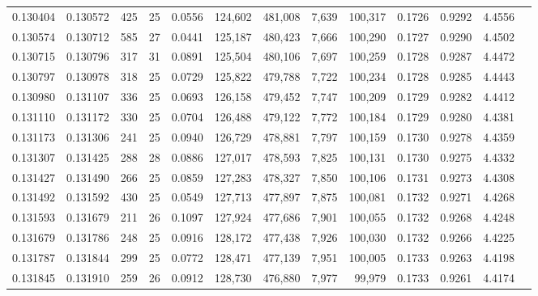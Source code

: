 \begin{tabular}{rrrrrrrrrrrrr}
0.130404 & 0.130572 & 425 &  25 &                                     0.0556 & 124,602 & 481,008 &   7,639 & 100,317 & 0.1726 & 0.9292 & 4.4556 \\
0.130574 & 0.130712 & 585 &  27 &                                     0.0441 & 125,187 & 480,423 &   7,666 & 100,290 & 0.1727 & 0.9290 & 4.4502 \\
0.130715 & 0.130796 & 317 &  31 &                                     0.0891 & 125,504 & 480,106 &   7,697 & 100,259 & 0.1728 & 0.9287 & 4.4472 \\
0.130797 & 0.130978 & 318 &  25 &                                     0.0729 & 125,822 & 479,788 &   7,722 & 100,234 & 0.1728 & 0.9285 & 4.4443 \\
0.130980 & 0.131107 & 336 &  25 &                                     0.0693 & 126,158 & 479,452 &   7,747 & 100,209 & 0.1729 & 0.9282 & 4.4412 \\
0.131110 & 0.131172 & 330 &  25 &                                     0.0704 & 126,488 & 479,122 &   7,772 & 100,184 & 0.1729 & 0.9280 & 4.4381 \\
0.131173 & 0.131306 & 241 &  25 &                                     0.0940 & 126,729 & 478,881 &   7,797 & 100,159 & 0.1730 & 0.9278 & 4.4359 \\
0.131307 & 0.131425 & 288 &  28 &                                     0.0886 & 127,017 & 478,593 &   7,825 & 100,131 & 0.1730 & 0.9275 & 4.4332 \\
0.131427 & 0.131490 & 266 &  25 &                                     0.0859 & 127,283 & 478,327 &   7,850 & 100,106 & 0.1731 & 0.9273 & 4.4308 \\
0.131492 & 0.131592 & 430 &  25 &                                     0.0549 & 127,713 & 477,897 &   7,875 & 100,081 & 0.1732 & 0.9271 & 4.4268 \\
0.131593 & 0.131679 & 211 &  26 &                                     0.1097 & 127,924 & 477,686 &   7,901 & 100,055 & 0.1732 & 0.9268 & 4.4248 \\
0.131679 & 0.131786 & 248 &  25 &                                     0.0916 & 128,172 & 477,438 &   7,926 & 100,030 & 0.1732 & 0.9266 & 4.4225 \\
0.131787 & 0.131844 & 299 &  25 &                                     0.0772 & 128,471 & 477,139 &   7,951 & 100,005 & 0.1733 & 0.9263 & 4.4198 \\
0.131845 & 0.131910 & 259 &  26 &                                     0.0912 & 128,730 & 476,880 &   7,977 &  99,979 & 0.1733 & 0.9261 & 4.4174 \\

\end{tabular}
